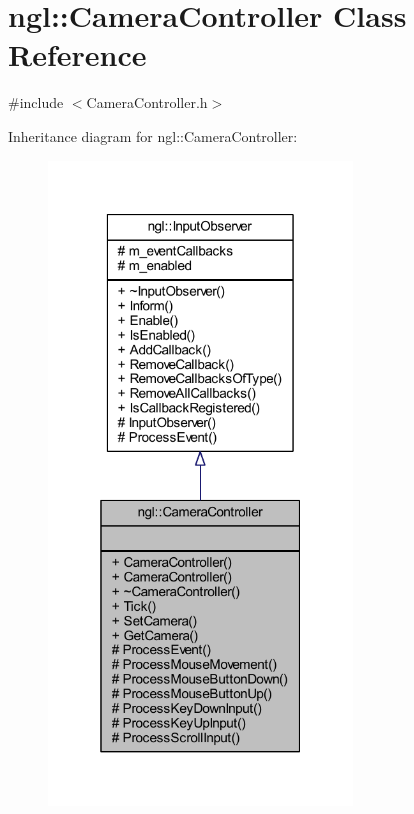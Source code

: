 \hypertarget{classngl_1_1_camera_controller}{}\section{ngl\+:\+:Camera\+Controller Class Reference}
\label{classngl_1_1_camera_controller}


{\ttfamily \#include $<$Camera\+Controller.\+h$>$}



Inheritance diagram for ngl\+:\+:Camera\+Controller\+:
\nopagebreak
\begin{figure}[H]
\begin{center}
\leavevmode
\includegraphics[width=229pt]{classngl_1_1_camera_controller__inherit__graph}
\end{center}
\end{figure}


